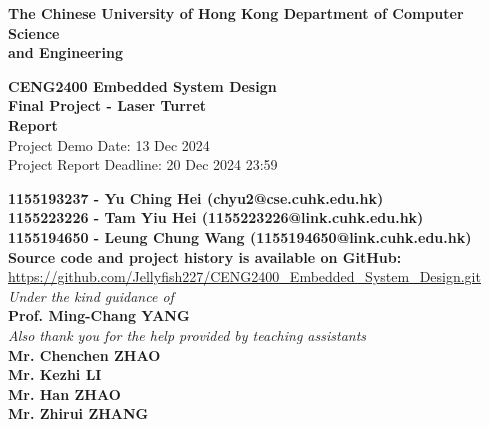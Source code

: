 \documentclass[12pt, a4paper]{article}
\begin{document}
\begin{titlepage}
    \begin{center}

		\bf\LARGE{The Chinese University of Hong Kong}
        \bf\Large{Department of Computer Science\\and Engineering}
		
		\vspace{80pt}
		
		\vspace{15pt}
		\textbf{\Large CENG2400 Embedded System Design\\}
		\vspace{6pt}
		\textbf{\Large Final Project - Laser Turret}\\
		\vspace{6pt}
		\textbf{\Large Report}\\
        \vspace{6pt}
        {\large Project Demo Date: 13 Dec 2024}\\
        {\large Project Report Deadline: 20 Dec 2024 23:59}
		\vspace{40pt}
		
        \vspace{15pt}
		\textbf{\normalsize
            1155193237 - Yu Ching Hei (chyu2@cse.cuhk.edu.hk)\\
			1155223226 - Tam Yiu Hei (1155223226@link.cuhk.edu.hk)\\
			1155194650 - Leung Chung Wang (1155194650@link.cuhk.edu.hk)\\}
		\vspace{40pt}
        \textbf{\large Source code and project history is available on GitHub:}\\
        \normalsize \url{https://github.com/Jellyfish227/CENG2400_Embedded_System_Design.git}\\
        \vspace{60pt}
		\textit{Under the kind guidance of}\\
		\textbf{\large Prof. Ming-Chang YANG}\\
		\vspace{20pt}
        \textit{Also thank you for the help provided by teaching assistants}\\
		\textbf{\large 
            Mr. Chenchen ZHAO\\
            Mr. Kezhi LI\\
            Mr. Han ZHAO\\
            Mr. Zhirui ZHANG\\
        }
		
	\end{center}
\end{titlepage}
\setcounter{page}{2}
\tableofcontents
\end{document}
